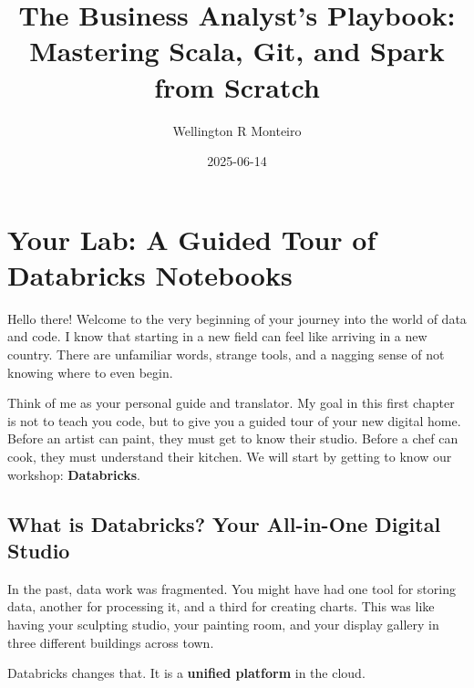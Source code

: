 \documentclass[
  letterpaper,
  DIV=11,
  numbers=noendperiod]{scrreprt}
\title{The Business Analyst's Playbook: Mastering Scala, Git, and Spark
from Scratch}
\author{Wellington R Monteiro}
\date{2025-06-14}
\renewcommand*\contentsname{Table of contents}
\newcommand\contentsname{Table of contents}
\begin{document}
\maketitle

\renewcommand*\contentsname{Table of contents}
{
\hypersetup{linkcolor=}
\setcounter{tocdepth}{2}
\tableofcontents
}


\chapter*{Your Lab: A Guided Tour of Databricks
Notebooks}\label{your-lab-a-guided-tour-of-databricks-notebooks}


Hello there! Welcome to the very beginning of your journey into the
world of data and code. I know that starting in a new field can feel
like arriving in a new country. There are unfamiliar words, strange
tools, and a nagging sense of not knowing where to even begin.

Think of me as your personal guide and translator. My goal in this first
chapter is not to teach you code, but to give you a guided tour of your
new digital home. Before an artist can paint, they must get to know
their studio. Before a chef can cook, they must understand their
kitchen. We will start by getting to know our workshop:
\textbf{Databricks}.

\section*{What is Databricks? Your All-in-One Digital
Studio}\label{what-is-databricks-your-all-in-one-digital-studio}


In the past, data work was fragmented. You might have had one tool for
storing data, another for processing it, and a third for creating
charts. This was like having your sculpting studio, your painting room,
and your display gallery in three different buildings across town.

Databricks changes that. It is a \textbf{unified platform} in the cloud.
\end{document}
